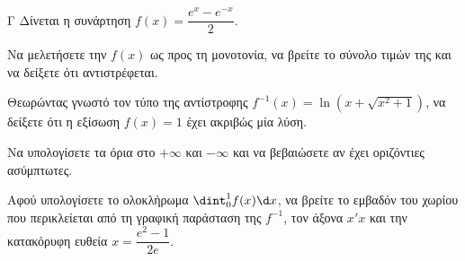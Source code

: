 \begin{thema}{Γ}
Δίνεται η συνάρτηση $f(x) = \dfrac{e^x - e^{-x}}{2}$. 
\begin{erwthma}
  \item Να μελετήσετε την $f(x)$ ως προς τη μονοτονία, να βρείτε το σύνολο τιμών της και να δείξετε ότι αντιστρέφεται.
  \item Θεωρώντας γνωστό τον τύπο της αντίστροφης $f^{-1}(x) = \ln(x + \sqrt{x^2+1})$, να δείξετε ότι η εξίσωση $f(x) = 1$ έχει ακριβώς μία λύση.
  \item Να υπολογίσετε τα όρια στο $+\infty$ και $-\infty$ και να βεβαιώσετε αν έχει οριζόντιες ασύμπτωτες.
  \item Αφού υπολογίσετε το ολοκλήρωμα $\dint_0^1 f(x) \d x$, να βρείτε το εμβαδόν του χωρίου που περικλείεται από τη γραφική παράσταση της $f^{-1}$, τον άξονα $x'x$ και την κατακόρυφη ευθεία $x = \dfrac{e^2-1}{2e}$.
\end{erwthma}
\end{thema}
